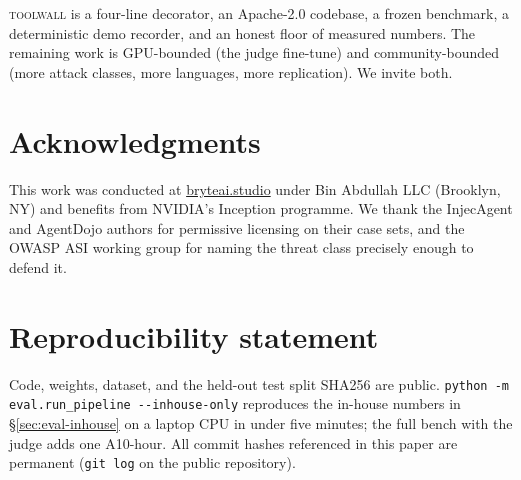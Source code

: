 \textsc{toolwall} is a four-line decorator, an Apache-2.0
codebase, a frozen benchmark, a deterministic demo recorder, and
an honest floor of measured numbers. The remaining work is
GPU-bounded (the judge fine-tune) and community-bounded (more
attack classes, more languages, more replication). We invite both.

\section*{Acknowledgments}

This work was conducted at \href{https://bryteai.studio}{bryteai.studio}
under Bin Abdullah LLC (Brooklyn, NY) and benefits from NVIDIA's
Inception programme. We thank the InjecAgent and AgentDojo authors
for permissive licensing on their case sets, and the OWASP ASI
working group for naming the threat class precisely enough to
defend it.

\section*{Reproducibility statement}

Code, weights, dataset, and the held-out test split SHA256 are
public. \verb|python -m eval.run_pipeline --inhouse-only|
reproduces the in-house numbers in \S\ref{sec:eval-inhouse} on a
laptop CPU in under five minutes; the full bench with the judge
adds one A10-hour. All commit hashes referenced in this paper are
permanent (\verb|git log| on the public repository).

